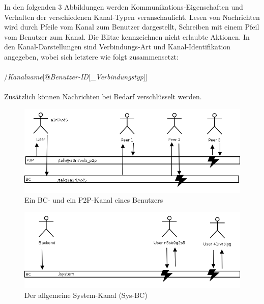 In den folgenden 3 Abbildungen werden Kommunikations-Eigenschaften und Verhalten der verschiedenen Kanal-Typen veranschaulicht. Lesen von Nachrichten wird durch Pfeile vom Kanal zum Benutzer dargestellt, Schreiben mit einem Pfeil vom Benutzer zum Kanal. Die Blitze kennzeichnen nicht erlaubte Aktionen. In den Kanal-Darstellungen sind Verbindungs-Art und Kanal-Identifikation angegeben, wobei sich letztere wie folgt zusammensetzt:\\ \\
/\textit{Kanalname}[@\textit{Benutzer-ID}[\_\textit{Verbindungstyp}]]\\ \\
Zusätzlich können Nachrichten bei Bedarf verschlüsselt werden. 
  \begin{figure}[H]
      \centering
	  \includegraphics[scale=0.47]{bilder/ps_infrastructure.png}
  	  \caption{Ein BC- und ein P2P-Kanal eines Benutzers}
  	  \label{fig:BCANDP2PCHANNEL}
  \end{figure}
  \begin{figure}[H]
      \centering
	  \includegraphics[scale=0.47]{bilder/ps_infrastructure_sys_bc.png} 
  	  \caption{Der allgemeine System-Kanal (Sys-BC)}
  \end{figure}

